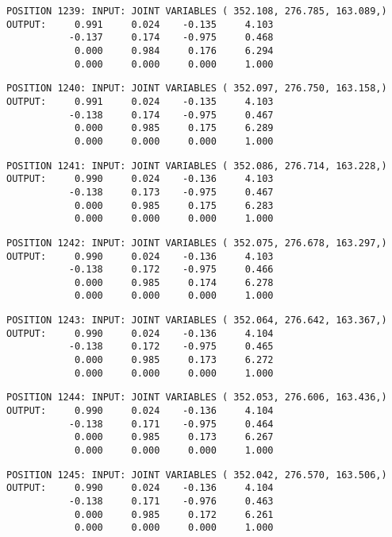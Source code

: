 \begin{verbatim}
POSITION 1239: INPUT: JOINT VARIABLES ( 352.108, 276.785, 163.089,)
OUTPUT:     0.991     0.024    -0.135     4.103
           -0.137     0.174    -0.975     0.468
            0.000     0.984     0.176     6.294
            0.000     0.000     0.000     1.000
\end{verbatim} \pagebreak[1]\begin{verbatim}
POSITION 1240: INPUT: JOINT VARIABLES ( 352.097, 276.750, 163.158,)
OUTPUT:     0.991     0.024    -0.135     4.103
           -0.138     0.174    -0.975     0.467
            0.000     0.985     0.175     6.289
            0.000     0.000     0.000     1.000
\end{verbatim} \pagebreak[1]\begin{verbatim}
POSITION 1241: INPUT: JOINT VARIABLES ( 352.086, 276.714, 163.228,)
OUTPUT:     0.990     0.024    -0.136     4.103
           -0.138     0.173    -0.975     0.467
            0.000     0.985     0.175     6.283
            0.000     0.000     0.000     1.000
\end{verbatim} \pagebreak[1]\begin{verbatim}
POSITION 1242: INPUT: JOINT VARIABLES ( 352.075, 276.678, 163.297,)
OUTPUT:     0.990     0.024    -0.136     4.103
           -0.138     0.172    -0.975     0.466
            0.000     0.985     0.174     6.278
            0.000     0.000     0.000     1.000
\end{verbatim} \pagebreak[1]\begin{verbatim}
POSITION 1243: INPUT: JOINT VARIABLES ( 352.064, 276.642, 163.367,)
OUTPUT:     0.990     0.024    -0.136     4.104
           -0.138     0.172    -0.975     0.465
            0.000     0.985     0.173     6.272
            0.000     0.000     0.000     1.000
\end{verbatim} \pagebreak[1]\begin{verbatim}
POSITION 1244: INPUT: JOINT VARIABLES ( 352.053, 276.606, 163.436,)
OUTPUT:     0.990     0.024    -0.136     4.104
           -0.138     0.171    -0.975     0.464
            0.000     0.985     0.173     6.267
            0.000     0.000     0.000     1.000
\end{verbatim} \pagebreak[1]\begin{verbatim}
POSITION 1245: INPUT: JOINT VARIABLES ( 352.042, 276.570, 163.506,)
OUTPUT:     0.990     0.024    -0.136     4.104
           -0.138     0.171    -0.976     0.463
            0.000     0.985     0.172     6.261
            0.000     0.000     0.000     1.000
\end{verbatim} \pagebreak[1]\begin{verbatim}

\end{verbatim}
